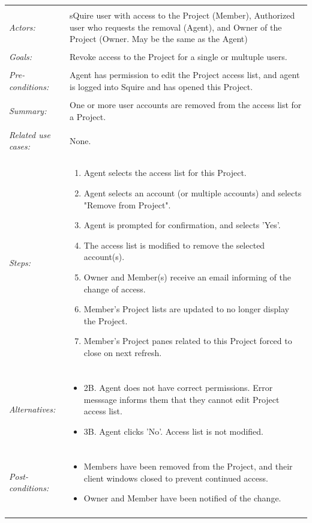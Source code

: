 \documentclass[11pt]{report}
\begin{document}
\begin{tabular}{ p{2cm} p{12cm} }   
 \hline
 \\
 \textit{Actors:} & sQuire user with access to the Project (Member), Authorized user who requests the removal (Agent), and Owner of the Project (Owner. May be the same as the Agent) \\
 \\
 \textit{Goals:} & Revoke access to the Project for a single or multuple users. \\
 \\
 \textit{Pre-conditions:} & Agent has permission to edit the Project access list, and agent is logged into Squire and has opened this Project. \\
 \\
 \textit{Summary:} & One or more user accounts are removed from the access list for a Project. \\ 
 \\
 \textit{Related use cases:} & None.  \\ 
 \\
 \textit{Steps:} & \begin{enumerate}
  \item Agent selects the access list for this Project.
	 \item Agent selects an account (or multiple accounts) and selects "Remove from Project".
	 \item Agent is prompted for confirmation, and selects 'Yes'.
	 \item The access list is modified to remove the selected account(s).
	 \item Owner and Member(s) receive an email informing of the change of access.
	 \item Member's Project lists are updated to no longer display the Project.
	 \item Member's Project panes related to this Project forced to close on next refresh.
 \end{enumerate} \\
 \\
 \textit{Alternatives:} & \begin{itemize} 
	 \item 2B. Agent does not have correct permissions. Error messsage informs them that they cannot edit Project access list.
	 \item 3B. Agent clicks 'No'. Access list is not modified.
	\end{itemize}\\
 \\
 \textit{Post-conditions:} & \begin{itemize}
	 \item Members have been removed from the Project, and their client windows closed to prevent continued access.
	 \item Owner and Member have been notified of the change.
 \end{itemize}\\
 \\
\hline
\end{tabular}
\end{document}

